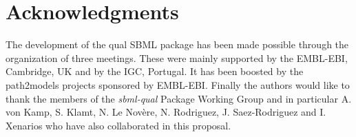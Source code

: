 
\section{Acknowledgments}
	\label{sec:acknowledgements}
	\label{sec:acknowledgments}
	
	The development of the qual SBML package has been made possible through the organization of three meetings. These were mainly supported by the EMBL-EBI, Cambridge, UK and by the IGC, Portugal. It has been boosted by the path2models projects sponsored by EMBL-EBI. Finally the authors would like to thank the members of the \textit{sbml-qual} Package Working Group and in particular A. von Kamp, S. Klamt, N. Le Nov\`ere, N. Rodriguez, J. Saez-Rodriguez and I. Xenarios who have also collaborated in this proposal.

